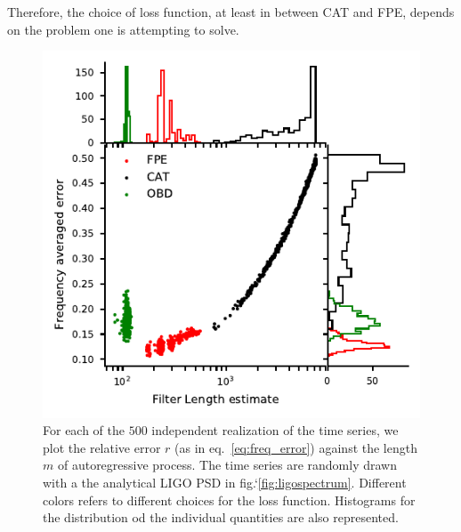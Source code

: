 \documentclass[twocolumn,showpacs,preprintnumbers,nofootinbib,prd,
superscriptaddress,10pt]{revtex4-1}
\begin{document}
Therefore, the choice of loss function, at least in between CAT and FPE, depends on the problem one is attempting to solve.
\begin{figure}
    \centering
    \includegraphics[width = \linewidth]{Images/optimisers_comparison/ligo/error_length_contour.pdf}
    \caption{For each of the $500$ independent realization of the time series, we plot the relative error $r$ (as in eq.~\eqref{eq:freq_error}) against the length $m$ of autoregressive process. The time series are randomly drawn with a the analytical LIGO PSD in fig.`\ref{fig:ligospectrum}. Different colors refers to different choices for the loss function. Histograms for the distribution od the individual quantities are also represented.}
    \label{fig:LigoOrderError}
\end{figure}
\end{document}
